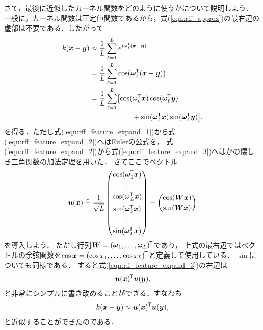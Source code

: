 さて，最後に近似したカーネル関数をどのように使うかについて説明しよう．
一般に，カーネル関数は正定値関数であるから，式(\ref{eqn:rff_approx})の最右辺の虚部は不要である．したがって
\begin{align}
    k(\boldsymbol{x} - \boldsymbol{y})
    &\approx \frac{1}{L} \sum_{\ell = 1}^{L} e^{i\boldsymbol{\omega}_\ell^{\mkern-1.5mu\mathsf{T}}(\boldsymbol{x} - \boldsymbol{y})}
    \label{eqn:rff_feature_expand_1} \\
    &= \frac{1}{L} \sum_{\ell = 1}^{L} \cos (\boldsymbol{\omega}_\ell^{\mkern-1.5mu\mathsf{T}}(\boldsymbol{x} - \boldsymbol{y}))
    \label{eqn:rff_feature_expand_2} \\
    &= \frac{1}{L} \sum_{\ell = 1}^{L} \bigl[
        \cos (\boldsymbol{\omega}_\ell^{\mkern-1.5mu\mathsf{T}}\boldsymbol{x}) \cos (\boldsymbol{\omega}_\ell^{\mkern-1.5mu\mathsf{T}}\boldsymbol{y}) \notag \\
    &\hspace{60pt} + \sin (\boldsymbol{\omega}_\ell^{\mkern-1.5mu\mathsf{T}}\boldsymbol{x}) \sin (\boldsymbol{\omega}_\ell^{\mkern-1.5mu\mathsf{T}}\boldsymbol{y}) \bigr],
    \label{eqn:rff_feature_expand_3}
\end{align}
を得る．ただし式(\ref{eqn:rff_feature_expand_1})から式(\ref{eqn:rff_feature_expand_2})へはEulerの公式を，
式(\ref{eqn:rff_feature_expand_2})から式(\ref{eqn:rff_feature_expand_3})へはかの懐しき三角関数の加法定理を用いた．
さてここでベクトル
\begin{equation}
    \boldsymbol{u}(\boldsymbol{x}) \triangleq \frac{1}{\sqrt{L}}
    \begin{pmatrix}
        \cos (\boldsymbol{\omega}_1^{\mkern-1.5mu\mathsf{T}}\boldsymbol{x}) \\
        \vdots \\
        \cos (\boldsymbol{\omega}_L^{\mkern-1.5mu\mathsf{T}}\boldsymbol{x}) \\[5pt]
        \sin (\boldsymbol{\omega}_1^{\mkern-1.5mu\mathsf{T}}\boldsymbol{x}) \\
        \vdots \\
        \sin (\boldsymbol{\omega}_L^{\mkern-1.5mu\mathsf{T}}\boldsymbol{x})
    \end{pmatrix}
    =
    \begin{pmatrix}
        \cos (\boldsymbol{W}\boldsymbol{x}) \\[2pt]
        \sin (\boldsymbol{W}\boldsymbol{x})
    \end{pmatrix}
    \label{eqn:rff_transform}
\end{equation}
を導入しよう．
ただし行列$\boldsymbol{W} = (\boldsymbol{\omega}_1, \ldots, \boldsymbol{\omega}_L)^{\mkern-1.5mu\mathsf{T}}$であり，
上式の最右辺ではベクトルの余弦関数を$\cos \boldsymbol{x} = (\cos x_1, \ldots, \cos x_L)^{\mkern-1.5mu\mathsf{T}}$と定義して使用している．
$\sin$についても同様である．
すると式(\ref{eqn:rff_feature_expand_3})の右辺は
\begin{equation}
    \boldsymbol{u}(\boldsymbol{x})^{\mkern-1.5mu\mathsf{T}} \boldsymbol{u}(\boldsymbol{y}),
\end{equation}
と非常にシンプルに書き改めることができる．すなわち
\begin{equation}
    k(\boldsymbol{x} - \boldsymbol{y}) \approx \boldsymbol{u}(\boldsymbol{x})^{\mkern-1.5mu\mathsf{T}} \boldsymbol{u}(\boldsymbol{y}),
    \label{eqn:rff_final}
\end{equation}
と近似することができたのである．


